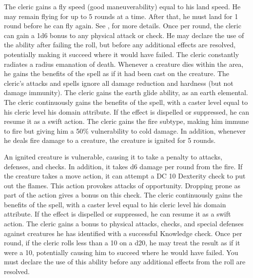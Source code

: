  The cleric gains a fly speed (good maneuverability) equal to his land speed. He may remain flying for up to 5 rounds at a time. After that, he must land for 1 round before he can fly again. See , for more details.
 Once per round, the cleric can gain a \plus1d6 bonus to any physical attack or check. He may declare the use of the ability after failing the roll, but before any additional effects are resolved, potentially making it succeed where it would have failed.
 The cleric constantly radiates a \areamed radius emanation of death. Whenever a creature dies within the area, he gains the benefits of the  spell as if it had been cast on the creature.
 The cleric's attacks and spells ignore all damage reduction and hardness (but not damage immunity).
 The cleric gains the earth glide ability, as an earth elemental.
 The cleric continuously gains the benefits of the  spell, with a caster level equal to his cleric level \add his domain attribute. If the effect is dispelled or suppressed, he can resume it as a swift action.
 The cleric gains the fire subtype, making him immune to fire but giving him a 50\% vulnerability to cold damage. In addition, whenever he deals fire damage to a creature, the creature is ignited for 5 rounds.
\par An ignited creature is vulnerable, causing it to take a  penalty to attacks, defenses, and checks. In addition, it takes d6 damage per round from the fire. If the creature takes a move action, it can attempt a DC 10 Dexterity check to put out the flames. This action provokes attacks of opportunity. Dropping prone as part of the action gives a  bonus on this check.
 The cleric continuously gains the benefits of the  spell, with a caster level equal to his cleric level \add his domain attribute. If the effect is dispelled or suppressed, he can resume it as a swift action.
 The cleric gains a  bonus to physical attacks, checks, and special defenses against creatures he has identified with a successful Knowledge check.
 Once per round, if the cleric rolls less than a 10 on a d20, he may treat the result as if it were a 10, potentially causing him to succeed where he would have failed. You must declare the use of this ability before any additional effects from the roll are resolved.

